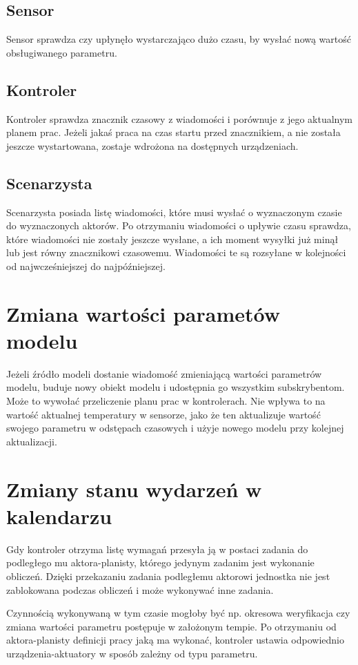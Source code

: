 \subsection{Sensor}
Sensor sprawdza czy upłynęło wystarczająco dużo czasu, by wysłać nową wartość obsługiwanego parametru. 


\subsection{Kontroler}
Kontroler sprawdza znacznik czasowy z wiadomości i porównuje z jego aktualnym planem prac. Jeżeli jakaś praca na czas startu przed znacznikiem, a nie została jeszcze wystartowana, zostaje wdrożona na dostępnych urządzeniach. 


\subsection{Scenarzysta}
Scenarzysta posiada listę wiadomości, które musi wysłać o wyznaczonym czasie do wyznaczonych aktorów. Po otrzymaniu wiadomości o upływie czasu sprawdza, które wiadomości nie zostały jeszcze wysłane, a ich moment wysyłki już minął lub jest równy znacznikowi czasowemu. Wiadomości te są rozsyłane w kolejności od najwcześniejszej do najpóźniejszej. 


\section{Zmiana wartości parametów modelu}
Jeżeli źródło modeli dostanie wiadomość zmieniającą wartości parametrów modelu, buduje nowy obiekt modelu i udostępnia go wszystkim subskrybentom.
Może to wywołać przeliczenie planu prac w kontrolerach. Nie wpływa to na wartość aktualnej temperatury w sensorze, jako że ten aktualizuje wartość swojego parametru w odstępach czasowych i użyje nowego modelu przy kolejnej aktualizacji.

\section{Zmiany stanu wydarzeń w kalendarzu}
Gdy kontroler otrzyma listę wymagań przesyła ją w postaci zadania do podległego mu aktora-planisty, którego jedynym zadanim jest wykonanie obliczeń. Dzięki przekazaniu zadania podległemu aktorowi jednostka nie jest zablokowana podczas obliczeń i może wykonywać inne zadania. 


Czynnością wykonywaną w tym czasie mogłoby być np. okresowa weryfikacja czy zmiana wartości parametru postępuje w założonym tempie.
Po otrzymaniu od aktora-planisty definicji pracy jaką ma wykonać, kontroler ustawia odpowiednio urządzenia-aktuatory w sposób zależny od typu parametru.


